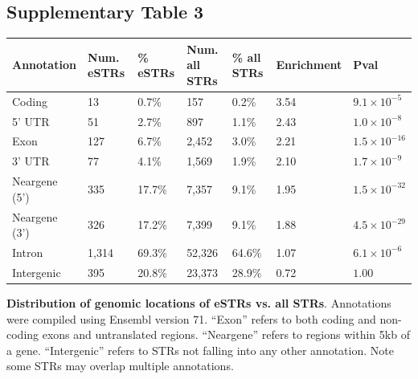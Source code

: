 \pagebreak
\subsection{Supplementary Table 3}
\label{tab:estrsuptab3}
\begin{table}[h!]
\begin{tabular}{l|l|l|l|l|l|l}
Annotation & Num. eSTRs & \% eSTRs & Num. all STRs & \% all STRs & Enrichment & Pval \\
\hline
Coding & 13 & 0.7\% & 157 & 0.2\% & 3.54 & $9.1 \times 10^{-5}$\\
5' UTR & 51 & 2.7\% & 897 & 1.1\% & 2.43 & $1.0 \times 10^{-8}$\\
Exon & 127 & 6.7\% & 2,452 & 3.0\% & 2.21 & $1.5 \times 10^{-16}$\\
3' UTR & 77 & 4.1\% & 1,569 & 1.9\% & 2.10 & $1.7 \times 10^{-9}$\\
Neargene (5') & 335 & 17.7\% & 7,357 & 9.1\% & 1.95 & $1.5 \times 10^{-32}$\\
Neargene (3') & 326 & 17.2\% & 7,399 & 9.1\% & 1.88 & $4.5 \times 10^{-29}$\\
Intron & 1,314 & 69.3\% & 52,326 & 64.6\% & 1.07 & $6.1 \times 10^{-6}$\\
Intergenic & 395 & 20.8\% & 23,373 & 28.9\% & 0.72 & $1.00$\\
\hline
\end{tabular}
\end{table}
\textbf{Distribution of genomic locations of eSTRs vs. all STRs}. Annotations were compiled using Ensembl version 71. ``Exon'' refers to both coding and non-coding exons and untranslated regions. ``Neargene'' refers to regions within 5kb of a gene. ``Intergenic'' refers to STRs not falling into any other annotation. Note some STRs may overlap multiple annotations.

\pagebreak
